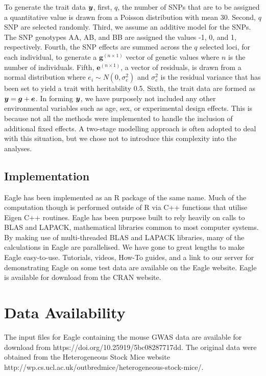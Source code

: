 \documentclass{nature}
\begin{document}
To generate the trait data $\bm{y}$, first, $q$, the number of SNPs that are to be assigned a quantitative value is drawn from a Poisson distribution with 
mean 30. Second, $q$ SNP are selected randomly. Third, we assume an additive model for the SNPs. The SNP genotypes AA, AB, and BB 
are assigned the values -1, 0, and 1, respectively. Fourth, the SNP effects are summed across the $q$ selected loci, for each individual, to 
generate a $\bm{g}^{(n \times 1)}$ vector of genetic values where $n$ is the number of individuals. 
Fifth, $\bm{e}^{(n \times 1)}$, a vector of residuals, is drawn from a normal distribution where $e_i \sim N(0, \sigma^2_e)$ and $\sigma^2_e$ is 
the residual variance that has been set to yield a trait with heritability 0.5. Sixth,  the trait data are formed as $\bm{y} =  \bm{g} + \bm{e}$.  
In forming $\bm{y}$, we have purposely not included any other environmental variables such as age, sex, or experimental design effects. This is because 
not all the methods were implemented to handle the inclusion of additional fixed effects. A two-stage modelling approach 
is often adopted to deal with this situation, but we chose not to introduce this complexity into the analyses.  



\subsection{Implementation}

Eagle has been implemented as an R package of the same name. Much of the computation though is performed outside of R 
via C++ functions that utilise Eigen C++ routines. Eagle has been purpose built to rely heavily on calls to BLAS and LAPACK, 
mathematical libraries common to most computer systems. By making use of multi-threaded  BLAS and LAPACK libraries, many of the 
calculations in Eagle are parallelised. We have gone to great lengths to make Eagle easy-to-use. Tutorials, videos, How-To guides, and 
a link to our server for demonstrating Eagle on some test data are available on the Eagle website. Eagle is available for download from the CRAN website. 

  
 
\section*{Data Availability}
The input files for Eagle containing the mouse GWAS data are available for download from 
https://doi.org/10.25919/5bc08287717dd. The original data were obtained from the Heterogeneous Stock Mice website 
http://wp.cs.ucl.ac.uk/outbredmice/heterogeneous-stock-mice/.  
\end{document}
